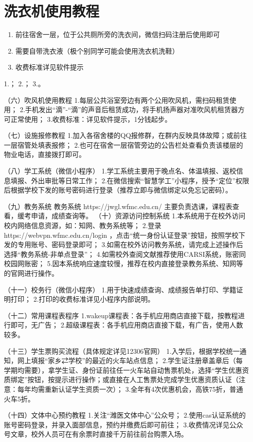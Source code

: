 \section[洗衣机使用教程]{洗衣机使用教程}
\begin{enumerate}
    \item 前往宿舍一层，位于公共厕所旁的洗衣间，微信扫码注册后使用即可
    \item 需要自带洗衣液（极个别同学可能会使用洗衣机洗鞋）
    \item 收费标准详见软件提示
\end{enumerate}
1.；
2.；
3.。

（六）吹风机使用教程
1.每层公共浴室旁边有两个公用吹风机，需扫码租赁使用；
2.手机发出“滴”-“滴”的声音后租赁成功，将手机扬声器对准吹风机租赁器方可正常使用；
3.收费标准：详见软件提示，1分钱起步。

（七）设施报修教程
1.加入各宿舍楼的QQ报修群，在群内反映具体故障；或前往一层宿管处填表报修；
2.也可在宿舍一层宿管旁边的公告栏处查看负责该楼层的物业电话，直接拨打即可。

（八）学工系统（微信小程序）
1.学工系统主要用于晚点名、体温填报、返校信息填报、外出审批等日常工作；
2.在微信搜索“智慧学工”小程序，授予“定位”权限后根据学校下发的账号密码进行登录（推荐立即与微信绑定以免忘记密码）。

（九）教务系统
教务系统 https://jwgl.wfmc.edu.cn/ 主要负责选课，课程表查看，缓考申请，成绩查询等。
（十）资源访问控制系统
1.本系统用于在校外访问校内网络信息资源，如：知网、教务系统等；
2.登录 https://webvpn.wfmc.edu.cn/login ，点击“统一身份认证登录”按钮，按照学校下发的专用账号、密码登录即可；
3.如需在校外访问教务系统，请完成上述操作后选择“教务系统-非单点登录”；
4.如需校外查阅文献推荐使用CARSI系统，账密同校园网账密；
5.因本系统响应速度较慢，推荐在校内直接登录教务系统、知网等的官网进行操作。

（十一）校务行（微信小程序）
1.用于快速成绩查询、成绩报告单打印、学籍证明打印；
2.打印的收费标准详见小程序内部说明。

（十二）常用课程表程序
1.wakeup课程表：各手机应用商店直接下载，按教程进行即可，无广告；
2.超级课程表：各手机应用商店直接下载，有广告，使用人数较多。

（十三）学生票购买流程（具体规定详见12306官网）
1.入学后，根据学校统一通知，网上填报“家乡⇄学校”的最近的火车站点信息；
2.学生证注册章盖章后（每学期均需要），拿学生证、身份证前往任一火车站自动售票机处，选择“学生优惠资质绑定”按钮，按提示进行操作；或直接在人工售票处完成学生优惠资质认证（注意：每年均需重新认证学生资质一次）；
3.全年有4次优惠机会，高铁75折，普通火车5折。

（十四）文体中心预约教程
1.关注“潍医文体中心”公众号；
2.使用cas认证系统的账号密码登录，并录入面部信息，预约并缴费后即可前往；
3.收费情况详见公众号文章，校外人员可在有余票时直接千万前往前台购票入场。